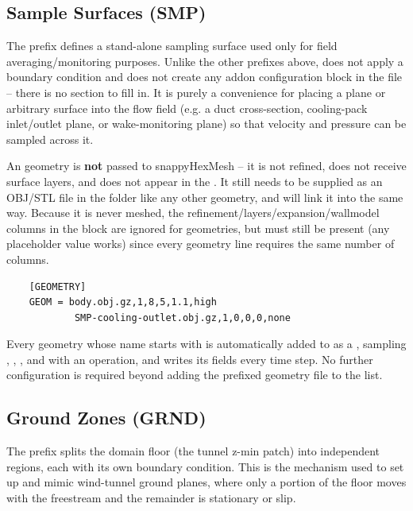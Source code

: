 \subsection{Sample Surfaces (SMP)}
The prefix  defines a stand-alone sampling surface used only for field averaging/monitoring purposes. Unlike the other prefixes above,  does not apply a boundary condition and does not create any addon configuration block in the  file -- there is no  section to fill in. It is purely a convenience for placing a plane or arbitrary surface into the flow field (e.g. a duct cross-section, cooling-pack inlet/outlet plane, or wake-monitoring plane) so that velocity and pressure can be sampled across it.

An  geometry is \textbf{not} passed to snappyHexMesh -- it is not refined, does not receive surface layers, and does not appear in the . It still needs to be supplied as an OBJ/STL file in the  folder like any other geometry, and  will link it into  the same way. Because it is never meshed, the refinement/layers/expansion/wallmodel columns in the \codeword{[GEOMETRY]} block are ignored for  geometries, but must still be present (any placeholder value works) since every geometry line requires the same number of columns.

\begin{lstlisting}
    [GEOMETRY]
    GEOM = body.obj.gz,1,8,5,1.1,high
            SMP-cooling-outlet.obj.gz,1,0,0,0,none
\end{lstlisting}

Every geometry whose name starts with  is automatically added to  as a , sampling , , , and  with an  operation, and writes its fields every time step. No further configuration is required beyond adding the  prefixed geometry file to the \codeword{[GEOMETRY]} list.

\subsection{Ground Zones (GRND)}
The prefix  splits the domain floor (the tunnel z-min patch) into independent regions, each with its own boundary condition. This is the mechanism used to set up and mimic wind-tunnel ground planes, where only a portion of the floor moves with the freestream and the remainder is stationary or slip.

